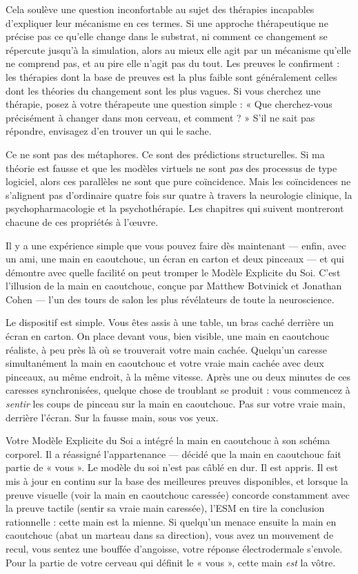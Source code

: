 \documentclass[11pt, twoside, openright]{book}
\begin{document}
Cela soulève une question inconfortable au sujet des thérapies incapables d'expliquer leur mécanisme en ces termes. Si une approche thérapeutique ne précise pas ce qu'elle change dans le substrat, ni comment ce changement se répercute jusqu'à la simulation, alors au mieux elle agit par un mécanisme qu'elle ne comprend pas, et au pire elle n'agit pas du tout. Les preuves le confirment : les thérapies dont la base de preuves est la plus faible sont généralement celles dont les théories du changement sont les plus vagues. Si vous cherchez une thérapie, posez à votre thérapeute une question simple : « Que cherchez-vous précisément à changer dans mon cerveau, et comment ? » S'il ne sait pas répondre, envisagez d'en trouver un qui le sache.

Ce ne sont pas des métaphores. Ce sont des prédictions structurelles. Si ma théorie est fausse et que les modèles virtuels ne sont \textit{pas} des processus de type logiciel, alors ces parallèles ne sont que pure coïncidence. Mais les coïncidences ne s'alignent pas d'ordinaire quatre fois sur quatre à travers la neurologie clinique, la psychopharmacologie et la psychothérapie. Les chapitres qui suivent montreront chacune de ces propriétés à l'œuvre.

Il y a une expérience simple que vous pouvez faire dès maintenant --- enfin, avec un ami, une main en caoutchouc, un écran en carton et deux pinceaux --- et qui démontre avec quelle facilité on peut tromper le Modèle Explicite du Soi. C'est l'illusion de la main en caoutchouc, conçue par Matthew Botvinick et Jonathan Cohen --- l'un des tours de salon les plus révélateurs de toute la neuroscience.

Le dispositif est simple. Vous êtes assis à une table, un bras caché derrière un écran en carton. On place devant vous, bien visible, une main en caoutchouc réaliste, à peu près là où se trouverait votre main cachée. Quelqu'un caresse simultanément la main en caoutchouc et votre vraie main cachée avec deux pinceaux, au même endroit, à la même vitesse. Après une ou deux minutes de ces caresses synchronisées, quelque chose de troublant se produit : vous commencez à \textit{sentir} les coups de pinceau sur la main en caoutchouc. Pas sur votre vraie main, derrière l'écran. Sur la fausse main, sous vos yeux.

Votre Modèle Explicite du Soi a intégré la main en caoutchouc à son schéma corporel. Il a réassigné l'appartenance --- décidé que la main en caoutchouc fait partie de « vous ». Le modèle du soi n'est pas câblé en dur. Il est appris. Il est mis à jour en continu sur la base des meilleures preuves disponibles, et lorsque la preuve visuelle (voir la main en caoutchouc caressée) concorde constamment avec la preuve tactile (sentir sa vraie main caressée), l'ESM en tire la conclusion rationnelle : cette main est la mienne. Si quelqu'un menace ensuite la main en caoutchouc (abat un marteau dans sa direction), vous avez un mouvement de recul, vous sentez une bouffée d'angoisse, votre réponse électrodermale s'envole. Pour la partie de votre cerveau qui définit le « vous », cette main \textit{est} la vôtre.
\end{document}
